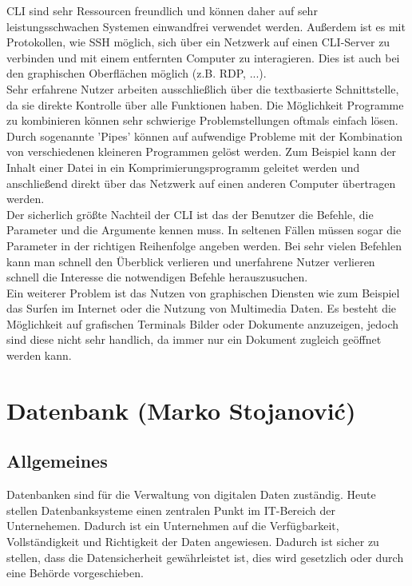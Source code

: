 \documentclass[12pt,a4paper]{report}
\begin{document}
\begin{onehalfspace}
CLI sind sehr Ressourcen freundlich und können daher auf sehr leistungsschwachen Systemen einwandfrei verwendet werden. Außerdem ist es mit Protokollen, wie SSH möglich, sich über ein Netzwerk auf einen CLI-Server zu verbinden und mit einem entfernten Computer zu interagieren. Dies ist auch bei den graphischen Oberflächen möglich (z.B. RDP, ...).\\

Sehr erfahrene Nutzer arbeiten ausschließlich über die textbasierte Schnittstelle, da sie direkte Kontrolle über alle Funktionen haben. Die Möglichkeit Programme zu kombinieren können sehr schwierige Problemstellungen oftmals einfach lösen. Durch sogenannte 'Pipes' können auf aufwendige Probleme mit der Kombination von verschiedenen kleineren Programmen gelöst werden. Zum Beispiel kann der Inhalt einer Datei in ein Komprimierungsprogramm geleitet werden und anschließend direkt über das Netzwerk auf einen anderen Computer übertragen werden.\\

Der sicherlich größte Nachteil der CLI ist das der Benutzer die Befehle, die Parameter und die Argumente kennen muss. In seltenen Fällen müssen sogar die Parameter in der richtigen Reihenfolge angeben werden. Bei sehr vielen Befehlen kann man schnell den Überblick verlieren und unerfahrene Nutzer verlieren schnell die Interesse die notwendigen Befehle herauszusuchen.\\

Ein weiterer Problem ist das Nutzen von graphischen Diensten wie zum Beispiel das Surfen im Internet oder die Nutzung von Multimedia Daten. Es besteht die Möglichkeit auf grafischen Terminals Bilder oder Dokumente anzuzeigen, jedoch sind diese nicht sehr handlich, da immer nur ein Dokument zugleich geöffnet werden kann.\\

\chapter{Datenbank (Marko Stojanovi\'{c})}

\section{Allgemeines}
Datenbanken sind für die Verwaltung von digitalen Daten zuständig. Heute stellen Datenbanksysteme einen zentralen Punkt im IT-Bereich der Unternehemen. Dadurch ist ein Unternehmen auf die Verfügbarkeit, Vollständigkeit und Richtigkeit der Daten angewiesen. Dadurch ist sicher zu stellen, dass die Datensicherheit gewährleistet ist, dies wird gesetzlich oder durch eine Behörde vorgeschieben.\\


\end{onehalfspace}
\end{document}

